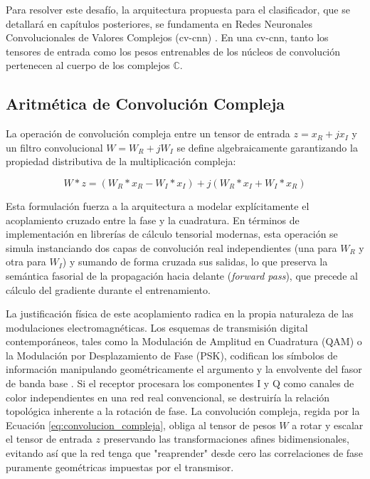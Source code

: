 Para resolver este desafío, la arquitectura propuesta para el clasificador, que se detallará en capítulos posteriores, se fundamenta en Redes Neuronales Convolucionales de Valores Complejos (\gls{cv-cnn}) \cite{bassey_survey_2021}. En una \gls{cv-cnn}, tanto los tensores de entrada como los pesos entrenables de los núcleos de convolución pertenecen al cuerpo de los complejos $\mathbb{C}$.

\subsection{Aritmética de Convolución Compleja}

La operación de convolución compleja entre un tensor de entrada $z = x_R + j x_I$ y un filtro convolucional $W = W_R + j W_I$ se define algebraicamente garantizando la propiedad distributiva de la multiplicación compleja:

\begin{equation}
    W \ast z = (W_R \ast x_R - W_I \ast x_I) + j(W_R \ast x_I + W_I \ast x_R)
    \label{eq:convolucion_compleja}
\end{equation}

Esta formulación fuerza a la arquitectura a modelar explícitamente el acoplamiento cruzado entre la fase y la cuadratura. En términos de implementación en librerías de cálculo tensorial modernas, esta operación se simula instanciando dos capas de convolución real independientes (una para $W_R$ y otra para $W_I$) y sumando de forma cruzada sus salidas, lo que preserva la semántica fasorial de la propagación hacia delante (\textit{forward pass}), que precede al cálculo del gradiente durante el entrenamiento.

La justificación física de este acoplamiento radica en la propia naturaleza de las modulaciones electromagnéticas. Los esquemas de transmisión digital contemporáneos, tales como la Modulación de Amplitud en Cuadratura (QAM) o la Modulación por Desplazamiento de Fase (PSK), codifican los símbolos de información manipulando geométricamente el argumento y la envolvente del fasor de banda base \cite{hirose_complex_2012}. Si el receptor procesara los componentes I y Q como canales de color independientes en una red real convencional, se destruiría la relación topológica inherente a la rotación de fase. La convolución compleja, regida por la Ecuación \ref{eq:convolucion_compleja}, obliga al tensor de pesos $W$ a rotar y escalar el tensor de entrada $z$ preservando las transformaciones afines bidimensionales, evitando así que la red tenga que "reaprender" desde cero las correlaciones de fase puramente geométricas impuestas por el transmisor.

